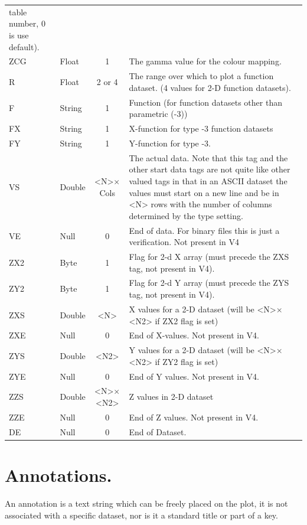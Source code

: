 \documentclass[english]{article}
\begin{document}
\begin{longtable}{|llcp{8cm}|}
  table number, 0 is use default).\\
  ZCG & Float & 1 & The gamma value for the colour mapping.\\
  R& Float& 2 or 4& The range over which to plot a function dataset. (4
  values for 2-D
  function datasets).\\
  F& String& 1&
  Function (for function datasets other than parametric (-3))\\
  FX& String& 1&
  X-function for type -3 function datasets\\
  FY& String& 1&
  Y-function for type -3.\\
  VS& Double& <N>$\times$Cols& The actual data. Note that this tag and
  the other start data tags are not quite like other valued tags in that
  in an ASCII dataset the values must start on a new line and be in <N>
  rows with the number of columns
  determined by the type setting.\\
  VE& Null& 0&
  End of data. For binary files this is just a verification. Not
  present in V4\\
  ZX2 & Byte & 1 & Flag for 2-d X array (must precede the ZXS tag, not
  present in V4).\\
  ZY2 & Byte & 1 & Flag for 2-d Y array (must precede the ZYS tag, not
  present in V4).\\
  ZXS& Double& <N>&
  X values for a 2-D dataset (will be <N>$\times$<N2> if ZX2 flag is set) \\
  ZXE& Null& 0&
  End of X-values. Not present in V4.\\
  ZYS& Double& <N2>&
  Y values for a 2-D dataset (will be <N>$\times$<N2> if ZY2 flag is set)\\
  ZYE& Null& 0&
  End of Y values. Not present in V4.\\
  ZZS& Double& <N>$\times$<N2>&
  Z values in 2-D dataset\\
  ZZE& Null& 0&
  End of Z values. Not present in V4.\\
  DE& Null& 0&
  End of Dataset.\\
\end{longtable}


\section{Annotations.}

An annotation is a text string which can be freely placed on the plot,
it is not associated with a specific dataset, nor is it a standard
title or part of a key.
\end{document}
